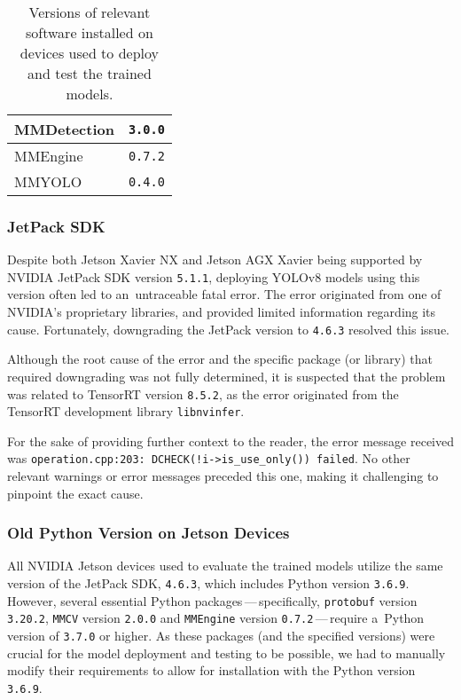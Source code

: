 \begin{table}[t]
\begin{threeparttable}
\begin{tabular}{|l|c|c|c|c|}
            \hline
            MMDetection      & \multicolumn{4}{c|}{\texttt{3.0.0}} \\
            \hline
            MMEngine         & \multicolumn{4}{c|}{\texttt{0.7.2}} \\
            \hline
            MMYOLO           & \multicolumn{4}{c|}{\texttt{0.4.0}} \\
            \hline
        \end{tabular}
        \caption{Versions of relevant software installed on devices used to
        deploy and test the trained models.}
        \label{DevicesPackages}
    \end{threeparttable}
\end{table}


\subsubsection*{JetPack SDK}

Despite both Jetson Xavier NX and Jetson AGX Xavier being supported by NVIDIA
JetPack SDK version \texttt{5.1.1}, deploying YOLOv8 models using this version
often led to an~untraceable fatal error. The error originated from one of
NVIDIA's proprietary libraries, and provided limited information regarding its
cause. Fortunately, downgrading the JetPack version to \texttt{4.6.3} resolved
this issue.

Although the root cause of the error and the specific package (or library) that
required downgrading was not fully determined, it is suspected that the problem
was related to TensorRT version \texttt{8.5.2}, as the error originated from the
TensorRT development library \texttt{libnvinfer}.

For the sake of providing further context to the reader, the error message
received was \verb|operation.cpp:203: DCHECK(!i->is_use_only()) failed|. No
other relevant warnings or error messages preceded this one, making it
challenging to pinpoint the exact cause.


\subsubsection*{Old Python Version on Jetson Devices}

All NVIDIA Jetson devices used to evaluate the trained models utilize the same
version of the JetPack SDK, \texttt{4.6.3}, which includes Python version
\texttt{3.6.9}. However, several essential Python packages\,---\,specifically,
\texttt{protobuf} version \texttt{3.20.2}, \texttt{MMCV} version \texttt{2.0.0}
and \texttt{MMEngine} version \texttt{0.7.2}\,---\,require a~Python version of
\texttt{3.7.0} or higher. As these packages (and the specified versions) were
crucial for the model deployment and testing to be possible, we had to manually
modify their requirements to allow for installation with the Python version
\texttt{3.6.9}.

